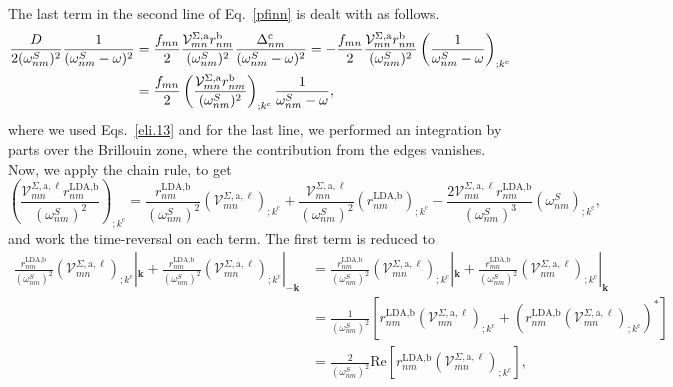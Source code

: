 The last term in the second line of Eq.~\eqref{pfinn} is dealt with as
follows.
\begin{align}\label{dresn}
\frac{D}{2(\omega^S_{nm})^2}\frac{1}{(\omega^S_{nm}-\omega)^2}
&=
\frac{f_{mn}}{2}\frac{{\mathbf{\cal V}}^{\Sigma,\mathrm{a}}_{mn}r^{\mathrm{b}}_{nm}}{(\omega^S_{nm})^2}
\frac{\Delta^{\mathrm{c}}_{nm}}{(\omega^S_{nm}-\omega)^2} 
=
-
\frac{f_{mn}}{2}
\frac{{\mathbf{\cal V}}^{\Sigma,\mathrm{a}}_{mn}r^{\mathrm{b}}_{nm}}{(\omega^S_{nm})^2}
\left(
\frac{1}{\omega^S_{nm}-\omega}
\right)_{;k^{\mathrm{c}}}
\nonumber\\
&=
\frac{f_{mn}}{2}
\left(
\frac{{\mathbf{\cal V}}^{\Sigma,\mathrm{a}}_{mn}r^{\mathrm{b}}_{nm}}{(\omega^S_{nm})^2}
\right)_{;k^{\mathrm{c}}}
\frac{1}{\omega^S_{nm}-\omega}
,
\end{align} 
where we used Eqs.~\eqref{eli.13}  and for the last
line, we performed an
integration by parts over the Brillouin zone,
where the contribution from the edges vanishes.\cite{ashcroft_solid_1976}
Now, we apply the chain rule, to get
\begin{equation}\label{chr}
    \left(\frac{\mathcal{V}^{\Sigma,\text{a},\ell}_{mn}r^{\text{LDA,b}}_{nm}}
    {(\omega^{S}_{nm})^2}\right)_{;k^{\text{c}}}
=   \frac{r^{\text{LDA,b}}_{nm}}{(\omega^{S}_{nm})^2}
    \left(\mathcal{V}^{\Sigma,\text{a},\ell}_{mn}\right)_{;k^{\text{c}}}
+   \frac{\mathcal{V}^{\Sigma,\text{a},\ell}_{mn}}{(\omega^{S}_{nm})^2}
    \left(r^{\text{LDA,b}}_{nm}\right)_{;k^{\text{c}}}
-   \frac{2\mathcal{V}^{\Sigma,\text{a},\ell}_{mn}
    r^{\text{LDA,b}}_{nm}}{(\omega^{S}_{nm})^3}
    \left(\omega^{S}_{nm}\right)_{;k^{\text{c}}}
,
\end{equation}
and work the time-reversal on each term.
The first term is reduced to
\begin{align}\label{first_term_gen_deriv}
    \frac{r^{\text{LDA,b}}_{nm}}{(\omega^{S}_{nm})^{2}}
    \left(\mathcal{V}^{\Sigma,\text{a},\ell}_{mn}\right)
    _{;k^{\text{c}}}|_{\mathbf{k}}
+   \frac{r^{\text{LDA,b}}_{nm}}{(\omega^{S}_{nm})^{2}}
    \left(\mathcal{V}^{\Sigma,\text{a},\ell}_{mn}\right)
    _{;k^{\text{c}}}|_{-\mathbf{k}}
&=  \frac{r^{\text{LDA,b}}_{nm}}{(\omega^{S}_{nm})^{2}}
    \left(\mathcal{V}^{\Sigma,\text{a},\ell}_{mn}\right)
    _{;k^{\text{c}}}|_{\mathbf{k}}
+   \frac{r^{\text{LDA,b}}_{mn}}{(\omega^{S}_{nm})^{2}}
    \left(\mathcal{V}^{\Sigma,\text{a},\ell}_{nm}\right)
    _{;k^{\text{c}}}|_{\mathbf{k}}\nonumber\\
&=  \frac{1}{(\omega^{S}_{nm})^{2}}\left[r^{\text{LDA,b}}_{nm}
    \left(\mathcal{V}^{\Sigma,\text{a},\ell}_{mn}\right)
    _{;k^{\text{c}}}
+   \left(r^{\text{LDA,b}}_{nm}
    \left(\mathcal{V}^{\Sigma,\text{a},\ell}_{mn}\right)
    _{;k^{\text{c}}}\right)^*\right]\nonumber\\
&=  \frac{2}{(\omega^{S}_{nm})^{2}}\mathrm{Re}\left[r^{\text{LDA,b}}_{nm}
    \left(\mathcal{V}^{\Sigma,\text{a},\ell}_{mn}\right)_{;k^{\text{c}}}\right]
,
\end{align}
